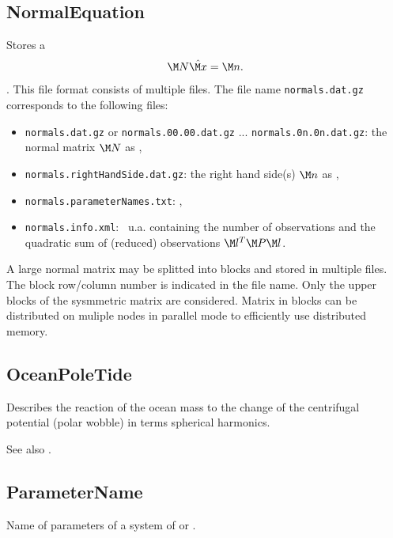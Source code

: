 \subsection{NormalEquation}\label{general.fileFormat:normalEquation}
Stores a 
\begin{equation}
  \M N \hat{\M x} = \M n.
\end{equation}.
This file format consists of multiple files.
The file name \verb|normals.dat.gz| corresponds to the following files:
\begin{itemize}
\item \verb|normals.dat.gz| or \verb|normals.00.00.dat.gz| ... \verb|normals.0n.0n.dat.gz|:
      the normal matrix $\M N$ as ,
\item \verb|normals.rightHandSide.dat.gz|:
      the right hand side(s) $\M n$ as ,
\item \verb|normals.parameterNames.txt|: ,
\item \verb|normals.info.xml|:
\     u.a. containing the number of observations and the quadratic sum of (reduced) observations $\M l^T\M P\M l$.
\end{itemize}
A large normal matrix may be splitted into blocks and stored in multiple files.
The block row/column number is indicated in the file name.
Only the upper blocks of the sysmmetric matrix are considered.
Matrix in blocks can be distributed on muliple nodes in parallel mode to efficiently use distributed memory.


\subsection{OceanPoleTide}\label{general.fileFormat:oceanPoleTide}
Describes the reaction of the ocean mass to the change
of the centrifugal potential (polar wobble) in terms spherical harmonics.

See also .


\subsection{ParameterName}\label{general.fileFormat:parameterName}
Name of parameters of a system of  or .

